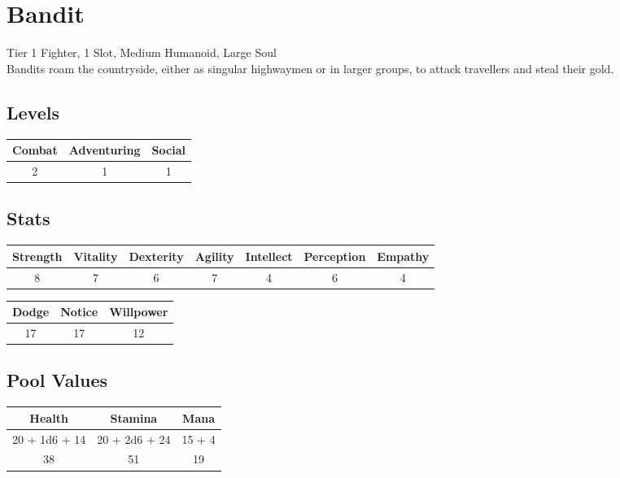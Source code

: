 \section{Bandit}\label{creature:bandit}
Tier 1 Fighter, 1 Slot, Medium Humanoid, Large Soul\\
Bandits roam the countryside, either as singular highwaymen or in larger groups, to attack travellers and steal their gold.

\subsection{Levels}
\begin{minipage}[H]{1\textwidth}
	\centering
	\begin{tabular}[c]{|c | c | c|}
		\hline
		Combat & Adventuring & Social\\
		\hline
		2 & 1 & 1\\
		\hline
	\end{tabular}
\end{minipage}

\subsection{Stats}
\begin{minipage}[H]{1\textwidth}
	\centering
	\begin{tabular}[c]{|c | c | c | c | c | c | c|}
		\hline
		Strength & Vitality & Dexterity & Agility & Intellect & Perception & Empathy\\
		\hline
		8 & 7 & 6 & 7 & 4 & 6 & 4\\
		\hline
	\end{tabular}
\end{minipage}

\begin{minipage}[H]{1\textwidth}
	\centering
	\begin{tabular}[c]{|c | c | c|}
		\hline
		Dodge & Notice & Willpower\\
		\hline
		17 & 17 & 12\\
		\hline
	\end{tabular}
\end{minipage}

\subsection{Pool Values}
\begin{minipage}[H]{1\textwidth}
	\centering
	\begin{tabular}[c]{|c | c | c|}
		\hline
		Health & Stamina & Mana\\
		\hline
		20 + 1d6 + 14 & 20 + 2d6 + 24 & 15 + 4 \\
		38 & 51 & 19\\
		\hline
	\end{tabular}
\end{minipage}

